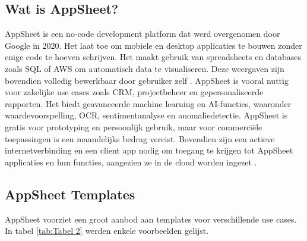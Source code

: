 

\subsection{Wat is AppSheet?}
AppSheet is een no-code development platform dat werd overgenomen door Google in 2020. Het laat toe om mobiele en desktop applicaties te bouwen zonder enige code te hoeven schrijven. Het maakt gebruik van spreadsheets en databases zoals SQL of AWS om automatisch data te visualiseren. Deze weergaven zijn bovendien volledig bewerkbaar door gebruiker zelf \autocite{AppSheet2020}. AppSheet is vooral nuttig voor zakelijke use cases zoals CRM, projectbeheer en gepersonaliseerde rapporten. Het biedt geavanceerde machine learning en AI-functies, waaronder waardevoorspelling, OCR, sentimentanalyse en anomaliedetectie. AppSheet is gratis voor prototyping en persoonlijk gebruik, maar voor commerciële toepassingen is een maandelijks bedrag vereist. Bovendien zijn een actieve internetverbinding en een client app nodig om toegang te krijgen tot AppSheet applicaties en hun functies, aangezien ze in de cloud worden ingezet \autocite{Petrovic2020}. \\

\subsection{AppSheet Templates}


AppSheet voorziet een groot aanbod aan templates voor verschillende use cases. In tabel \ref{tab:Tabel 2} werden enkele voorbeelden gelijst. 

